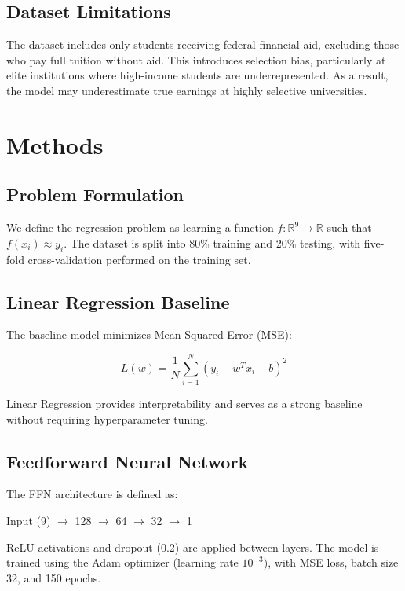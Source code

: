\documentclass[11pt]{article}
\begin{document}
\subsection{Dataset Limitations}

The dataset includes only students receiving federal financial aid, excluding those who pay full tuition without aid. This introduces selection bias, particularly at elite institutions where high-income students are underrepresented. As a result, the model may underestimate true earnings at highly selective universities.

\section{Methods}

\subsection{Problem Formulation}

We define the regression problem as learning a function $f: \mathbb{R}^9 \rightarrow \mathbb{R}$ such that $f(x_i) \approx y_i$. The dataset is split into 80\% training and 20\% testing, with five-fold cross-validation performed on the training set.

\subsection{Linear Regression Baseline}

The baseline model minimizes Mean Squared Error (MSE):

\[
L(w) = \frac{1}{N} \sum_{i=1}^{N} (y_i - w^T x_i - b)^2
\]

Linear Regression provides interpretability and serves as a strong baseline without requiring hyperparameter tuning.

\subsection{Feedforward Neural Network}

The FFN architecture is defined as:

\begin{center}
Input (9) $\rightarrow$ 128 $\rightarrow$ 64 $\rightarrow$ 32 $\rightarrow$ 1
\end{center}

ReLU activations and dropout (0.2) are applied between layers. The model is trained using the Adam optimizer (learning rate $10^{-3}$), with MSE loss, batch size 32, and 150 epochs.
\end{document}
